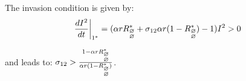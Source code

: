 %
%    

The invasion condition is given by:
 $$\left. \frac{d I^{2}}{d t} \right|_{1^*} =
(\alpha r R_{\begin{subarray}{l}\varnothing \\
    \varnothing \end{subarray}}^* + \sigma_{12} \alpha r
(1-R_{\begin{subarray}{l}\varnothing \\ \varnothing \end{subarray}}^*)
-1) I^{2}>0$$

and leads to: $\sigma_{12} > \frac{1-\alpha
  r R_{\begin{subarray}{l}\varnothing \\
      \varnothing \end{subarray}}^*}{\alpha
  r(1-R_{\begin{subarray}{l}\varnothing \\
      \varnothing \end{subarray}}^*)}$.

